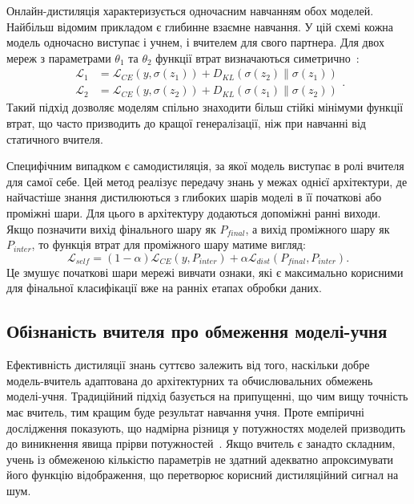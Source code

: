\documentclass{pma-mthesis}
\begin{document}
Онлайн-дистиляція характеризується одночасним навчанням обох моделей. Найбільш відомим прикладом є глибинне взаємне навчання. У цій схемі кожна модель одночасно виступає і учнем, і вчителем для свого партнера. Для двох мереж з параметрами $\theta_1$ та $\theta_2$ функції втрат визначаються симетрично~\cite{zhang2018deep}:
\begin{equation}
\begin{aligned}
    \mathcal{L}_1 &= \mathcal{L}_{CE}(y, \sigma(z_1)) + D_{KL}(\sigma(z_2) \parallel \sigma(z_1)) \\
    \mathcal{L}_2 &= \mathcal{L}_{CE}(y, \sigma(z_2)) + D_{KL}(\sigma(z_1) \parallel \sigma(z_2))
\end{aligned}.
\end{equation}
Такий підхід дозволяє моделям спільно знаходити більш стійкі мінімуми функції втрат, що часто призводить до кращої генералізації, ніж при навчанні від статичного вчителя.

Специфічним випадком є самодистиляція, за якої модель виступає в ролі вчителя для самої себе. Цей метод реалізує передачу знань у межах однієї архітектури, де найчастіше знання дистилюються з глибоких шарів моделі в її початкові або проміжні шари. Для цього в архітектуру додаються допоміжні ранні виходи. Якщо позначити вихід фінального шару як $P_{final}$, а вихід проміжного шару як $P_{inter}$, то функція втрат для проміжного шару матиме вигляд:
\begin{equation}
    \mathcal{L}_{self} = (1-\alpha)\mathcal{L}_{CE}(y, P_{inter}) + \alpha \mathcal{L}_{dist}(P_{final}, P_{inter}).
\end{equation}
Це змушує початкові шари мережі вивчати ознаки, які є максимально корисними для фінальної класифікації вже на ранніх етапах обробки даних.


\subsection{Обізнаність вчителя про обмеження моделі-учня}

Ефективність дистиляції знань суттєво залежить від того, наскільки добре модель-вчитель адаптована до архітектурних та обчислювальних обмежень моделі-учня. Традиційний підхід базується на припущенні, що чим вищу точність має вчитель, тим кращим буде результат навчання учня. Проте емпіричні дослідження показують, що надмірна різниця у потужностях моделей призводить до виникнення явища прірви потужностей~\cite{mirzadeh2020improved}. Якщо вчитель є занадто складним, учень із обмеженою кількістю параметрів не здатний адекватно апроксимувати його функцію відображення, що перетворює корисний дистиляційний сигнал на шум.
\end{document}
